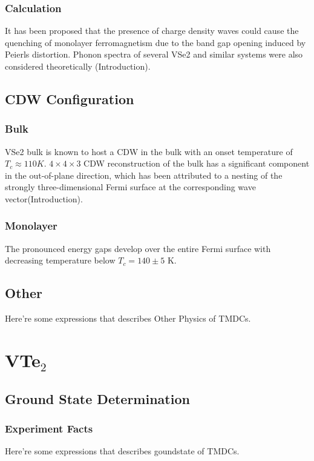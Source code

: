 \subsection{Calculation}
It has been proposed that the presence of charge density waves could cause the quenching of monolayer ferromagnetism due to the band gap opening induced by Peierls distortion. Phonon spectra of several VSe2 and similar systems were also considered theoretically \cite{C9CP03726H}(Introduction).
\section{CDW Configuration}
\subsection{Bulk}
VSe2 bulk is known to host a CDW in the bulk with an onset temperature of $T_c \approx 110 K$. $4 \times 4 \times 3$ CDW reconstruction of the bulk has a significant component in the
out-of-plane direction, which has been attributed to a nesting of the strongly three-dimensional Fermi surface at the corresponding wave vector\cite{doi:10.1021/acs.nanolett.8b01649}(Introduction).

\subsection{Monolayer}
The pronounced energy gaps develop over the entire Fermi surface with decreasing temperature below $T_c = 140 \pm 5$ K\cite{doi:10.1021/acs.nanolett.8b01649}.
\section{Other}
Here're some expressions that describes Other Physics of TMDCs.

\chapter{VTe$_2$}

\section{Ground State Determination}
\subsection{Experiment Facts}
Here're some expressions that describes goundstate of TMDCs.

